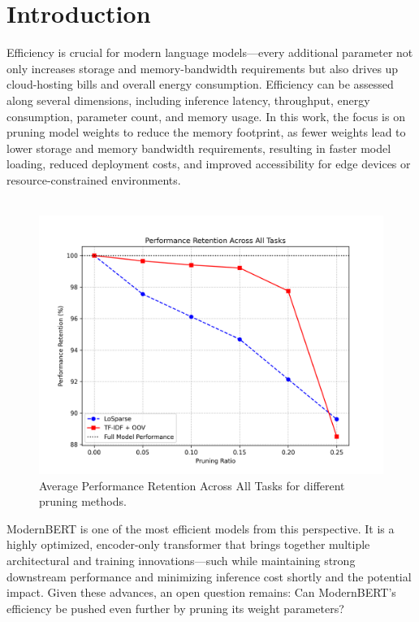 \documentclass[twocolumn]{article}
\begin{document}
\section{Introduction}
Efficiency is crucial for modern language models—every additional parameter not only increases storage and memory-bandwidth requirements but also drives up cloud-hosting bills and overall energy consumption.
Efficiency can be assessed along several dimensions, including inference latency, throughput, energy consumption, parameter count, and memory usage.
In this work, the focus is on pruning model weights to reduce the memory footprint, as fewer weights lead to lower storage and memory bandwidth requirements, resulting in faster model loading, reduced deployment costs, and improved accessibility for edge devices or resource-constrained environments.
\\ \\
\begin{figure}[t]
\centering
\includegraphics[width=\columnwidth]{images/performance_retention.png}
\caption{Average Performance Retention Across All Tasks for different pruning methods.}
\label{fig:pruning_retention}
\end{figure}
ModernBERT is one of the most efficient models from this perspective. 
It is a highly optimized, encoder-only transformer that brings together multiple architectural and training innovations—such while maintaining strong downstream performance and minimizing inference cost shortly and the potential impact. 
Given these advances, an open question remains: Can ModernBERT's efficiency be pushed even further by pruning its weight parameters?
\end{document}
